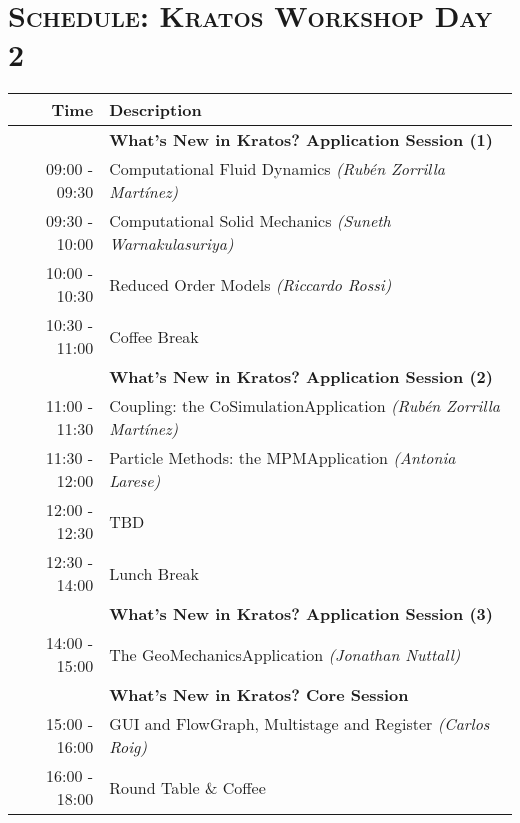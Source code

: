 \documentclass{article}
\begin{document}
\newpage
\section*{\centering \textsc{Schedule: Kratos Workshop Day 2}}

\begin{table}[h]\centering
   \begin{tabular}{r|l}
      \toprule\rule{0mm}{5mm}
      {\large Time} & {\large Description} \\[1ex]
      \midrule\rule{0mm}{4mm}
                    & {\large \textbf{What's New in Kratos? Application Session (1)}} \\[1ex]
      09:00 - 09:30 & Computational Fluid Dynamics \textit{(Rubén Zorrilla Martínez)}\\[1ex]
      09:30 - 10:00 & Computational Solid Mechanics \textit{(Suneth Warnakulasuriya)}\\[1ex]
      10:00 - 10:30 & Reduced Order Models \textit{(Riccardo Rossi)}\\[1ex]
      \hline\rule{0mm}{5mm}
      10:30 - 11:00 & Coffee Break \\[1ex]
      \hline\rule{0mm}{5mm}
                    & {\large \textbf{What's New in Kratos? Application Session (2)}} \\[1ex]
      11:00 - 11:30 & Coupling: the CoSimulationApplication \textit{(Rubén Zorrilla Martínez)}\\[1ex]
      11:30 - 12:00 & Particle Methods: the MPMApplication \textit{(Antonia Larese)}\\[1ex]
      12:00 - 12:30 & TBD \\[1ex]
      \hline\rule{0mm}{5mm}
      12:30 - 14:00 & Lunch Break \\[1ex]
      \hline\rule{0mm}{5mm}
                    & {\large \textbf{What's New in Kratos? Application Session (3)}} \\[1ex]
      14:00 - 15:00 & The GeoMechanicsApplication \textit{(Jonathan Nuttall)}\\[1ex]
      \hline\rule{0mm}{5mm}
                    & {\large \textbf{What's New in Kratos? Core Session}} \\[1ex]
      15:00 - 16:00 & GUI and FlowGraph, Multistage and Register \textit{(Carlos Roig)}\\[1ex]
      \hline\rule{0mm}{5mm}
      16:00 - 18:00 & Round Table \& Coffee \\[1ex]
      \bottomrule
   \end{tabular}
\end{table}
\end{document}
